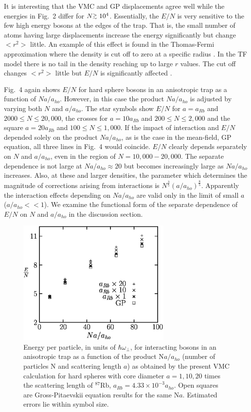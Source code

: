 \documentclass[aps,pra,twocolumn,groupedaddress]{revtex4}
\def\gapx{\lower 2pt \hbox{$\buildrel>\over{\scriptstyle{\sim}}$\ }}
\begin{document}
It is interesting that the VMC and GP displacements agree well while the
energies in Fig.~2 differ for $N \gapx 10^4$. Essentially, the $E/N$ is very
sensitive to the few high energy bosons at the edges of the trap. That is, the
small number of atoms having large displacements increase the energy
significantly but change $<r^2>$ little. An example of this effect is found in
the Thomas-Fermi approximation where the density is cut off to zero at a
specific radius \cite{dalfovo99}. In the TF model there is no tail in the density reaching up to
large $r$ values. The cut off changes $<r^2>$ little but $E/N$ is
significantly affected \cite{dalfovo99}.

Fig.~4 again shows $E/N$ for hard sphere bosons in an anisotropic trap as a
function of $Na/a_{ho}$. 
However, in this case the product $Na/a_{ho}$ is adjusted by varying
both $N$ and $a/a_{ho}$. 
The star symbols show $E/N$ for $a=a_{Rb}$ and $2000 \leq N \leq 20,000$, the
crosses for $a=10a_{Rb}$ and $200 \leq N \leq 2,000$ and the square
$a=20a_{Rb}$ and $100 \leq N \leq 1,000$.
If the impact of
interaction and $E/N$ depended solely on the product $Na/a_{ho}$, as is the case in the
mean-field, GP equation, all three lines in Fig.~4 would coincide. $E/N$ clearly
depends separately on $N$ and $a/a_{ho}$, even in the region of $N = 10,000-20,000$.
The separate dependence is not large at $Na/a_{ho} \approx 20$ but becomes increasingly
large as $Na/a_{ho}$ increases. Also, at these and larger densities, the parameter
which determines the magnitude of corrections arising from interactions is
$N^\frac{3}{5}(a/a_{ho})^{\frac{8}{5} }$. Apparently the interaction effects depending on $Na/a_{ho}$ are
valid only in the limit of small $a$ ($a/a_{ho} << 1$).  We examine the functional form of
the separate dependence of $E/N$ on $N$ and $a/a_{ho}$ in the discussion section.
    \begin{figure}
\begin{center}
\includegraphics[width=3in]{fig4.ps}
\caption{\footnotesize 
	Energy per particle, in units of $\hbar\omega_{\perp}$, for
        interacting bosons in an anisotropic trap
        as a function of the product N$a/a_{ho}$ (number of particles N and scattering
	length $a$) as obtained by the present VMC calculation for hard spheres
	with core diameter $a = 1,10,20$ times the scattering length of $^{87}$Rb,
	$a_{Rb} = 4.33 \times 10^{-3}a_{ho}$.  Open squares are Gross-Pitaevskii 
	equation results for the same N$a$.  Estimated errors lie within symbol size. 
        }
\end{center}
    \end{figure}
\end{document}
